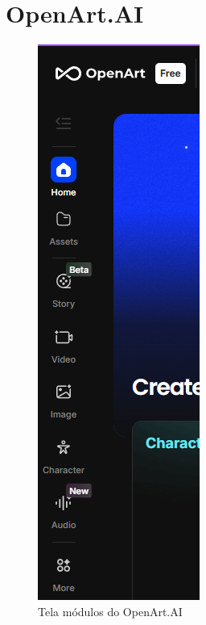 \FloatBarrier
\section{OpenArt.AI}
\label{s.OpenArtApendice}

\begin{figure}[htbp]
    \centering
    \begin{minipage}{0.45\textwidth}
    \centering
    \caption{\small Tela módulos do OpenArt.AI}
    \label{fig:openArtModulos}
    \includegraphics[width=0.7\linewidth]{figs/OpenArtAI/telaOpenArt.PNG}

\end{minipage}
\end{figure}
